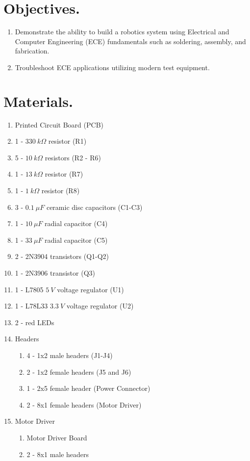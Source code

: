 \documentclass{handout}
\begin{document}
	\maketitle
	
	\section{Objectives.} 
	\begin{enumerate}
		\item Demonstrate the ability to build a robotics system using Electrical and Computer Engineering (ECE) fundamentals such as soldering, assembly, and fabrication.
		\item Troubleshoot ECE applications utilizing modern test equipment.
	\end{enumerate}
	
	\section{Materials.}
	\begin{enumerate}
		\item Printed Circuit Board (PCB)
		\item 1 - $330\ k\Omega$ resistor (R1)
		\item 5 - $10\ k\Omega$ resistors (R2 - R6)
		\item 1 - $13\ k\Omega$ resistor (R7)
		\item 1 - $1\ k\Omega$ resistor (R8)
		\item 3 - $0.1\ \mu F$ ceramic disc capacitors (C1-C3)
		\item 1 - $10\ \mu F$ radial capacitor (C4)
		\item 1 - $33\ \mu F$ radial capacitor (C5)
		\item 2 - 2N3904 transistors (Q1-Q2)
		\item 1 - 2N3906 transistor (Q3)
		\item 1 - L7805 $5\ V$ voltage regulator (U1)
		\item 1 - L78L33 $3.3\ V$ voltage regulator (U2)
		\item 2 - red LEDs
		\item Headers
		\begin{enumerate}
			\item 4 - 1x2 male headers (J1-J4)
			\item 2 - 1x2 female headers (J5 and J6)
			\item 1 - 2x5 female header (Power Connector)
			\item 2 - 8x1 female headers (Motor Driver)
		\end{enumerate}
		\item Motor Driver
		\begin{enumerate}
			\item Motor Driver Board
			\item 2 - 8x1 male headers
		\end{enumerate}
	\end{enumerate}
\end{document}
